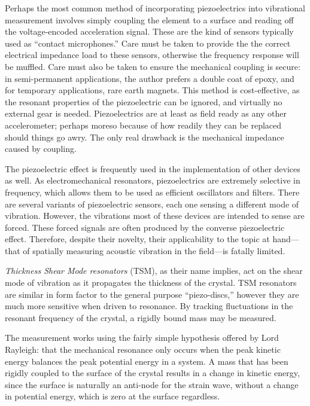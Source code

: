 \documentclass[a4paper,10pt]{report}
\numberwithin{equation}{section}
\begin{document}
Perhaps the most common method of incorporating piezoelectrics into vibrational measurement involves simply coupling the element to a surface and reading off the voltage-encoded acceleration signal. These are the kind of sensors typically used as ``contact microphones.'' Care must be taken to provide the the correct electrical impedance load to these sensors, otherwise the frequency response will be muffled. Care must also be taken to ensure the mechanical coupling is secure: in semi-permanent applications, the author prefers a double coat of epoxy, and for temporary applications, rare earth magnets. This method is cost-effective, as the resonant properties of the piezoelectric can be ignored, and virtually no external gear is needed. Piezoelectrics are at least as field ready as any other accelerometer; perhaps moreso because of how readily they can be replaced should things go awry. The only real drawback is the mechanical impedance caused by coupling. 

The piezoelectric effect is frequently used in the implementation of other devices as well. As electromechanical resonators, piezoelectrics are extremely selective in frequency, which allows them to be used as efficient oscillators and filters. \cite[p.~27]{Kino1987} There are several variants of piezoelectric sensors, each one sensing a different mode of vibration. However, the vibrations most of these devices are intended to sense are forced. These forced signals are often produced by the converse piezoelectric effect. \cite[p.~154]{Cremer1973} Therefore, despite their novelty, their applicability to the topic at hand---that of spatially measuring acoustic vibration in the field---is fatally limited.

\emph{Thickness Shear Mode resonators} (TSM), as their name implies, act on the shear mode of vibration as it propagates the thickness of the crystal. TSM resonators are similar in form factor to the general purpose ``piezo-discs,'' however they are much more sensitive when driven to resonance. By tracking fluctuations in the resonant frequency of the crystal, a rigidly bound mass may be measured. \cite[p.~37]{Ballantine1997}

The measurement works using the fairly simple hypothesis offered by Lord Rayleigh: that the mechanical resonance only occurs when the peak kinetic energy balances the peak potential energy in a system. A mass that has been rigidly coupled to the surface of the crystal results in a change in kinetic energy, since the surface is naturally an anti-node for the strain wave, without a change in potential energy, which is zero at the surface regardless. \cite[p.~43]{Ballantine1997} 
\end{document}
